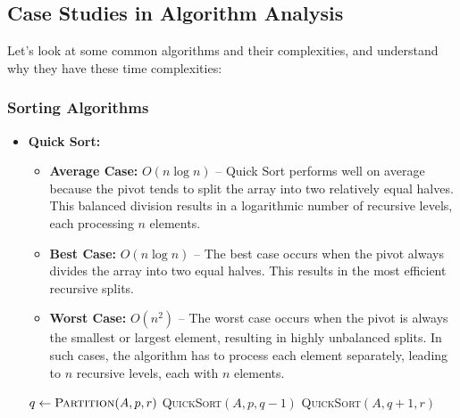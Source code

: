 \documentclass[12pt]{book} %
\begin{document}
\subsection{Case Studies in Algorithm Analysis}
Let's look at some common algorithms and their complexities, and understand why they have these time complexities:

\subsubsection{Sorting Algorithms}
\begin{itemize}
    \item \textbf{Quick Sort:}
        \begin{itemize}
            \item \textbf{Average Case:} $O(n \log n)$ – Quick Sort performs well on average because the pivot tends to split the array into two relatively equal halves. This balanced division results in a logarithmic number of recursive levels, each processing $n$ elements.
            \item \textbf{Best Case:} $O(n \log n)$ – The best case occurs when the pivot always divides the array into two equal halves. This results in the most efficient recursive splits.
            \item \textbf{Worst Case:} $O(n^2)$ – The worst case occurs when the pivot is always the smallest or largest element, resulting in highly unbalanced splits. In such cases, the algorithm has to process each element separately, leading to $n$ recursive levels, each with $n$ elements.
        \end{itemize}
        \begin{algorithm}
            \caption{Quick Sort}
            \begin{algorithmic}[1]
                        \State $q \gets \textsc{Partition}(A, p, r)$
                        \State \textsc{QuickSort}$(A, p, q-1)$
                        \State \textsc{QuickSort}$(A, q+1, r)$
                    \EndIf
                    \EndProcedure
                \end{algorithmic}
            \end{algorithm}
\end{itemize}
\end{document}
